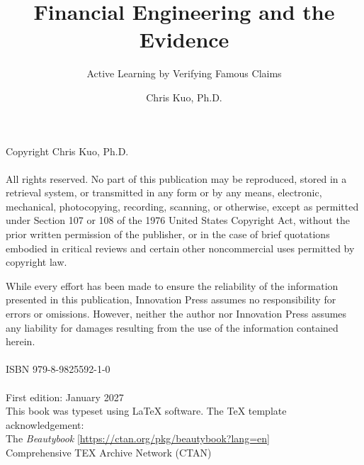 \documentclass[12pt]{Beautybook-EN}
\begin{document}
\thispagestyle{empty}
\title{Financial Engineering and the Evidence}
\subtitle{Active Learning by Verifying Famous Claims}
\author{Chris Kuo, Ph.D.}
\makeatletter





\newpage
\vspace*{\fill}
\footnotesize
\noindent Copyright \textcopyright{} Chris Kuo, Ph.D. \\
\\
\noindent  All rights reserved. No part of this publication may be reproduced, stored in a retrieval system, or transmitted in any form or by any means, electronic, mechanical, photocopying, recording, scanning, or otherwise, except as permitted under Section 107 or 108 of the 1976 United States Copyright Act, without the prior written permission of the publisher, or in the case of brief quotations embodied in critical reviews and certain other noncommercial uses permitted by copyright law. 

\noindent  
While every effort has been made to ensure the reliability of the information presented in this publication, Innovation Press assumes no responsibility for errors or omissions. However, neither the author nor Innovation Press assumes any liability for damages resulting from the use of the information contained herein. \\
\\


 \noindent  ISBN 979-8-9825592-1-0
 \\
 \\
\noindent First edition:  January 2027 \\

\noindent This book was typeset using \LaTeX{} software. 
The  \TeX{}  template acknowledgement:  \\
 The \textit{Beautybook} \url{[https://ctan.org/pkg/beautybook?lang=en]} \\
Comprehensive TEX Archive Network (CTAN)\\
\\
\end{document}
